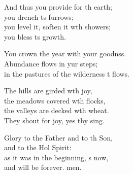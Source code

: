 \begin{psalmverse}
\begin{patverse}
And thus you provide for th earth;\Med\\
you drench \pointup{\i}ts furrows;\\
you level it, soften it w\pointup{\i}th showers;\Med\\
you bless \pointup{\i}ts growth.

You crown the year with your goodnss.\Flex\\
Abundance flows in yur steps;\Med\\
in the pastures of the wilderness \pointup{\i}t flows.

The hills are girded w\pointup{\i}th joy,\Med\\
the meadows covered w\pointup{\i}th flocks,\\
the valleys are decked w\pointup{\i}th wheat.\Med\\
They shout for joy, yes thy sing.

Glory to the Father and to th Son,\Med\\
and to the Hol Spirit:\\
as it was in the beginning, \pointup{\i}s now,\Med\\
and will be forever. men. 
  \end{patverse}
\end{psalmverse}
